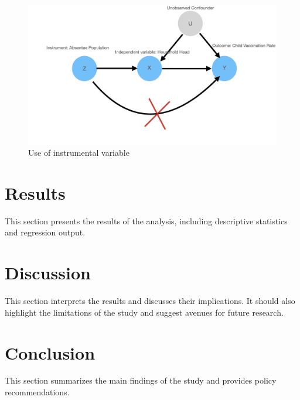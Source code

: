 \documentclass[12pt]{article}
\begin{document}
\begin{figure}[H]
    \centering
    \includegraphics[width=1.0\textwidth]{iv_model.001.jpeg}
    \caption{Use of instrumental variable}
    \label{Table of Summary Statistics}
\end{figure}



\section{Results}
This section presents the results of the analysis, including descriptive statistics and regression output.

\section{Discussion}
This section interprets the results and discusses their implications. It should also highlight the limitations of the study and suggest avenues for future research.

\section{Conclusion}
This section summarizes the main findings of the study and provides policy recommendations.



\end{document}

